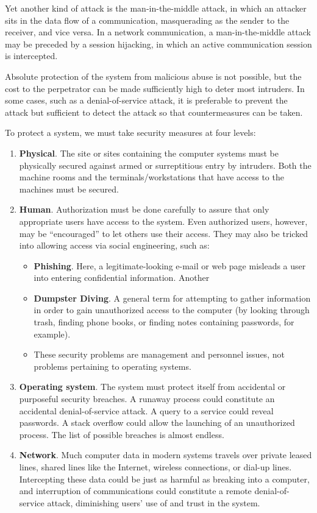 Yet another kind of attack is the man-in-the-middle attack, in which an attacker sits in the data flow of a communication, masquerading as the sender to the receiver, and vice versa.
In a network communication, a man-in-the-middle attack may be preceded by a session hijacking, in which an active communication session is intercepted.

Absolute protection of the system from malicious abuse is not possible, but the cost to the perpetrator can be made sufficiently high to deter most intruders.
In some cases, such as a denial-of-service attack, it is preferable to prevent the attack but sufficient to detect the attack so that countermeasures can be taken.

To protect a system, we must take security measures at four levels:
\begin{enumerate}[noitemsep]
\item \textbf{Physical}.
  The site or sites containing the computer systems must be physically secured against armed or surreptitious entry by intruders.
  Both the machine rooms and the terminals/workstations that have access to the machines must be secured.
\item \textbf{Human}.
  Authorization must be done carefully to assure that only appropriate users have access to the system.
  Even authorized users, however, may be ``encouraged'' to let others use their access.
  They may also be tricked into allowing access via social engineering, such as:
  \begin{itemize}[noitemsep]
  \item \textbf{Phishing}.
    Here, a legitimate-looking e-mail or web page
    misleads a user into entering confidential information. Another

  \item \textbf{Dumpster Diving}.
    A general term for attempting to gather information in order to gain unauthorized access to the computer (by looking through trash, finding phone books, or finding notes containing passwords, for example).
  \item These security problems are management and personnel issues, not problems pertaining to operating systems.
  \end{itemize}
\item \textbf{Operating system}.
  The system must protect itself from accidental or purposeful security breaches.
  A runaway process could constitute an accidental denial-of-service attack.
  A query to a service could reveal passwords.
  A stack overflow could allow the launching of an unauthorized process.
  The list of possible breaches is almost endless.
\item \textbf{Network}.
  Much computer data in modern systems travels over private leased lines, shared lines like the Internet, wireless connections, or dial-up lines.
  Intercepting these data could be just as harmful as breaking into a computer, and interruption of communications could constitute a remote denial-of-service attack, diminishing users’ use of and trust in the system.
\end{enumerate}

